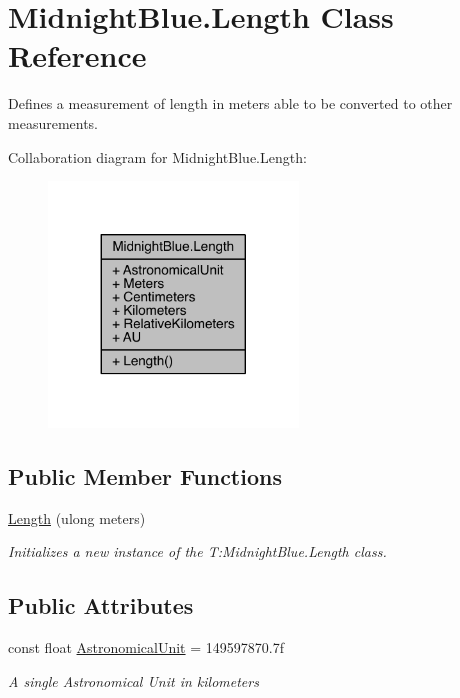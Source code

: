 \hypertarget{class_midnight_blue_1_1_length}{}\section{Midnight\+Blue.\+Length Class Reference}
\label{class_midnight_blue_1_1_length}


Defines a measurement of length in meters able to be converted to other measurements.  




Collaboration diagram for Midnight\+Blue.\+Length\+:\nopagebreak
\begin{figure}[H]
\begin{center}
\leavevmode
\includegraphics[width=188pt]{class_midnight_blue_1_1_length__coll__graph}
\end{center}
\end{figure}
\subsection*{Public Member Functions}
\begin{DoxyCompactItemize}
\item 
\hyperlink{class_midnight_blue_1_1_length_a8c58b161c6f730c22d84b01b078bd091}{Length} (ulong meters)
\begin{DoxyCompactList}\small\item\em Initializes a new instance of the T\+:\+Midnight\+Blue.\+Length class. \end{DoxyCompactList}\end{DoxyCompactItemize}
\subsection*{Public Attributes}
\begin{DoxyCompactItemize}
\item 
const float \hyperlink{class_midnight_blue_1_1_length_a5e86fa7e1d296ca9e6c5406a863427a6}{Astronomical\+Unit} = 149597870.\+7f
\begin{DoxyCompactList}\small\item\em A single Astronomical Unit in kilometers \end{DoxyCompactList}\end{DoxyCompactItemize}
